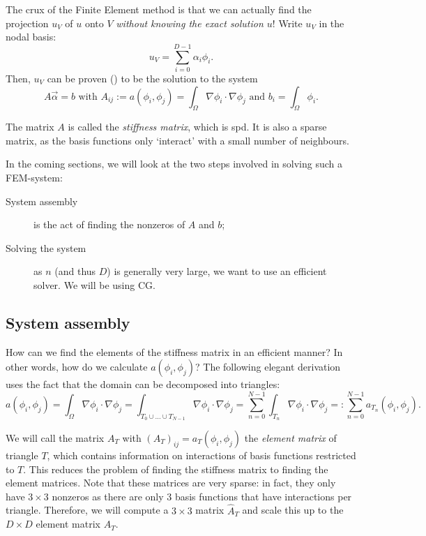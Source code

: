 \documentclass[11pt]{amsart}
\theoremstyle{definition}
\begin{document}
The crux of the Finite Element method is that we can actually find the projection $u_V$ of $u$ onto $V$ \emph{without knowing the exact solution $u$}! Write $u_V$ in the nodal basis:
\[
  u_V = \sum_{i=0}^{D-1} \alpha_i \phi_i.
\]
Then, $u_V$ can be proven (\cite[p.~19]{rayscriptie}) to be the solution to the system
\[
	A\vec \alpha = b \text{ with }  A_{ij} := a(\phi_i, \phi_j) = \int_\Omega \nabla \phi_i \cdot \nabla \phi_j \text{ and } b_i = \int_\Omega \phi_i.
\]

The matrix $A$ is called the \emph{stiffness matrix}, which is spd. \cite[p.~42]{rayscriptie} It is also a sparse matrix, as the basis functions only `interact' with a small number of neighbours.

In the coming sections, we will look at the two steps involved in solving such a FEM-system:
\begin{description}
  \item[System assembly] is the act of finding the nonzeros of $A$ and $b$;
  \item[Solving the system] as $n$ (and thus $D$) is generally very large, we want to use an efficient solver. We will be using CG.
\end{description}

\subsection{System assembly}
How can we find the elements of the stiffness matrix in an efficient manner? In other words, how do we calculate $a(\phi_i, \phi_j)$? The following elegant derivation uses the fact that the domain can be decomposed into triangles:
\begin{equation}
  \label{eqn:div}
	a(\phi_i, \phi_j) = \int_\Omega \nabla \phi_i \cdot \nabla \phi_j = \int_{T_0 \cup \dots \cup T_{N-1}} \nabla \phi_i \cdot \nabla \phi_j = \sum_{n = 0}^{N-1} \int_{T_n} \nabla \phi_i \cdot \nabla \phi_j =: \sum_{n=0}^{N-1}a_{T_n}(\phi_i, \phi_j).
\end{equation}

We will call the matrix $A_T$ with $(A_T)_{ij} = a_T(\phi_i, \phi_j)$ the \emph{element matrix} of triangle $T$, which contains information on interactions of basis functions restricted to $T$. This reduces the problem of finding the stiffness matrix to finding the element matrices. Note that these matrices are very sparse: in fact, they only have $3 \times 3$ nonzeros as there are only 3 basis functions that have interactions per triangle. Therefore, we will compute a $3 \times 3$ matrix $\hat A_T$ and scale this up to the $D \times D$ element matrix $A_T$.
\end{document}
